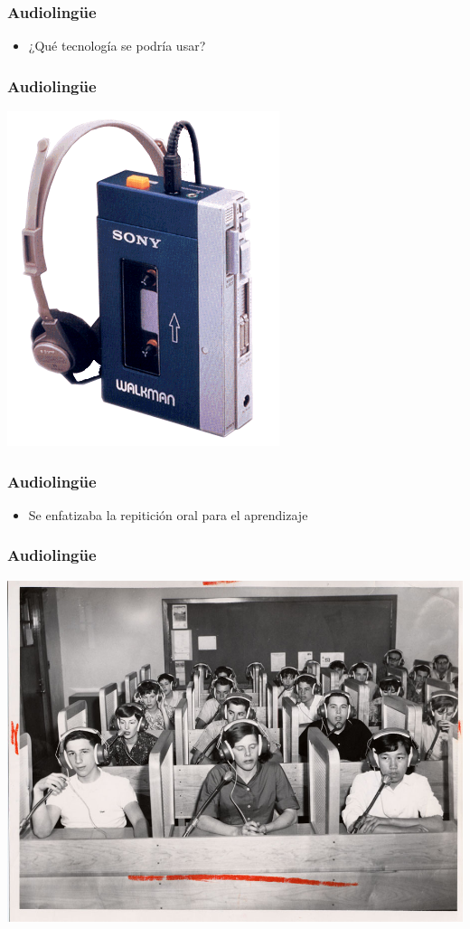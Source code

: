 \documentclass{beamer}
\begin{document}
\begin{frame}
	\frametitle{Audiolingüe}

	\begin{itemize}
		\item ¿Qué tecnología se podría usar?
	\end{itemize}
\end{frame}

\begin{frame}
	\frametitle{Audiolingüe}

	\begin{center}
		\includegraphics[width=.5\textwidth]{figures/walkman.png}
	\end{center}
\end{frame}

\begin{frame}
	\frametitle{Audiolingüe}

	\begin{itemize}
		\item Se enfatizaba la repitición oral para el aprendizaje
	\end{itemize}
\end{frame}

\begin{frame}
	\frametitle{Audiolingüe}

	\begin{center}
		\includegraphics[width=.9\textwidth]{figures/languagelab.jpg}
	\end{center}
\end{frame}
\end{document}
